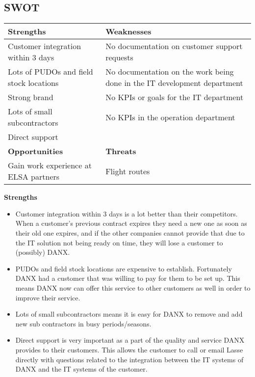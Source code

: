 \subsection{SWOT}

\begin{tabular}{| p{} | p{} |}
\hline
\rowcolor{GR}
\textbf{Strengths} & \textbf{Weaknesses} \\ \hline
Customer integration within 3 days & No documentation on customer support requests \\ \hline
Lots of PUDOs and field stock locations & No documentation on the work being done in the IT development department\\ \hline
Strong brand & No KPIs or goals for the IT department \\ \hline
Lots of small subcontractors & No KPIs in the operation department  \\ \hline
Direct support & \\ \hline \hline
\rowcolor{GR}
\textbf{Opportunities} & \textbf{Threats} \\ \hline
Gain work experience at ELSA partners & Flight routes \\ \hline
\end{tabular}
\qquad

\textbf{Strengths}
\begin{itemize}
\item Customer integration within 3 days is a lot better than their competitors. When a customer’s previous contract expires they need a new one as soon as their old one expires, and if the other companies cannot provide that due to the IT solution not being ready on time, they will lose a customer to (possibly) DANX.
\item PUDOs and field stock locations are expensive to establish. Fortunately DANX had a customer that was willing to pay for them to be set up. This means DANX now can offer this service to other customers as well in order to improve their service.
\item Lots of small subcontractors means it is easy for DANX to remove and add new sub contractors in busy periods/seasons. 
\item Direct support is very important as a part of the quality and service DANX provides to their customers. This allows the customer to call or email Lasse directly with questions related to the integration between the IT systems of DANX and the IT systems of the customer.
\end{itemize}

